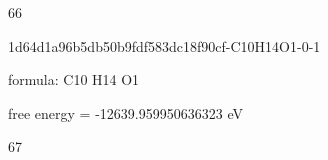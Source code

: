 \documentclass{article}
\begin{document}
66

\vspace{1cm}


1d64d1a96b5db50b9fdf583dc18f90cf-C10H14O1-0-1



formula: C10 H14 O1



free energy = -12639.959950636323 eV

67
\end{document}
